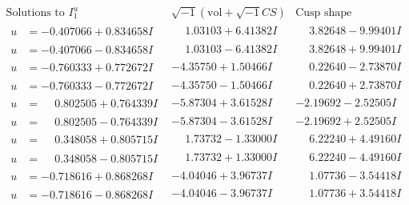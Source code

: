 \documentclass[1p]{elsarticle_modified}
\theoremstyle{definition}
\newcommand{\I}{\sqrt{-1}}
\begin{document}
$$\begin{array}{c|c|c}  
\text{Solutions to }I^u_{1}& \I (\text{vol} + \sqrt{-1}CS) & \text{Cusp shape}\\
 \hline 
\begin{aligned}
u &= -0.407066 + 0.834658 I\end{aligned}
 & \phantom{-}1.03103 + 6.41382 I & \phantom{-}3.82648 - 9.99401 I \\ \hline\begin{aligned}
u &= -0.407066 - 0.834658 I\end{aligned}
 & \phantom{-}1.03103 - 6.41382 I & \phantom{-}3.82648 + 9.99401 I \\ \hline\begin{aligned}
u &= -0.760333 + 0.772672 I\end{aligned}
 & -4.35750 + 1.50466 I & \phantom{-}0.22640 - 2.73870 I \\ \hline\begin{aligned}
u &= -0.760333 - 0.772672 I\end{aligned}
 & -4.35750 - 1.50466 I & \phantom{-}0.22640 + 2.73870 I \\ \hline\begin{aligned}
u &= \phantom{-}0.802505 + 0.764339 I\end{aligned}
 & -5.87304 + 3.61528 I & -2.19692 - 2.52505 I \\ \hline\begin{aligned}
u &= \phantom{-}0.802505 - 0.764339 I\end{aligned}
 & -5.87304 - 3.61528 I & -2.19692 + 2.52505 I \\ \hline\begin{aligned}
u &= \phantom{-}0.348058 + 0.805715 I\end{aligned}
 & \phantom{-}1.73732 - 1.33000 I & \phantom{-}6.22240 + 4.49160 I \\ \hline\begin{aligned}
u &= \phantom{-}0.348058 - 0.805715 I\end{aligned}
 & \phantom{-}1.73732 + 1.33000 I & \phantom{-}6.22240 - 4.49160 I \\ \hline\begin{aligned}
u &= -0.718616 + 0.868268 I\end{aligned}
 & -4.04046 + 3.96737 I & \phantom{-}1.07736 - 3.54418 I \\ \hline\begin{aligned}
u &= -0.718616 - 0.868268 I\end{aligned}
 & -4.04046 - 3.96737 I & \phantom{-}1.07736 + 3.54418 I \\ \hline\begin{aligned}

\end{aligned}
\end{array}$$
\end{document}
